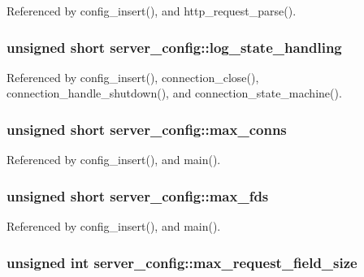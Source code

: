 Referenced by config\-\_\-insert(), and http\-\_\-request\-\_\-parse().

\hypertarget{structserver__config_ab028ad3b381dd25f502164e52e1ae206}{
\subsubsection[{log\-\_\-state\-\_\-handling}]{\setlength{\rightskip}{0pt plus 5cm}unsigned short server\-\_\-config\-::log\-\_\-state\-\_\-handling}}\label{structserver__config_ab028ad3b381dd25f502164e52e1ae206}


Referenced by config\-\_\-insert(), connection\-\_\-close(), connection\-\_\-handle\-\_\-shutdown(), and connection\-\_\-state\-\_\-machine().

\hypertarget{structserver__config_a124053000ad46a1b4b5a81fbfcf07a3a}{
\subsubsection[{max\-\_\-conns}]{\setlength{\rightskip}{0pt plus 5cm}unsigned short server\-\_\-config\-::max\-\_\-conns}}\label{structserver__config_a124053000ad46a1b4b5a81fbfcf07a3a}


Referenced by config\-\_\-insert(), and main().

\hypertarget{structserver__config_ae65013d5141af52b410821b845236a31}{
\subsubsection[{max\-\_\-fds}]{\setlength{\rightskip}{0pt plus 5cm}unsigned short server\-\_\-config\-::max\-\_\-fds}}\label{structserver__config_ae65013d5141af52b410821b845236a31}


Referenced by config\-\_\-insert(), and main().

\hypertarget{structserver__config_aac02592a904eec5fd5363a5da7037713}{
\subsubsection[{max\-\_\-request\-\_\-field\-\_\-size}]{\setlength{\rightskip}{0pt plus 5cm}unsigned int server\-\_\-config\-::max\-\_\-request\-\_\-field\-\_\-size}}\label{structserver__config_aac02592a904eec5fd5363a5da7037713}


